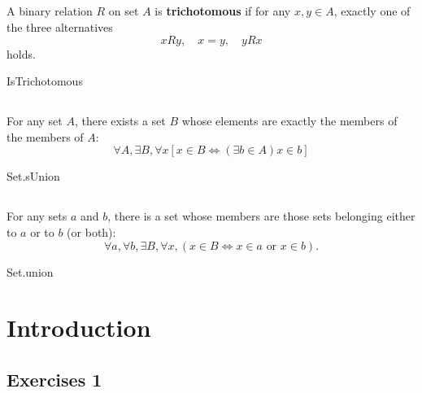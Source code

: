 \documentclass{report}
\begin{document}
\section{}%

  A binary relation $R$ on set $A$ is \textbf{trichotomous} if for any
    $x, y \in A$, exactly one of the three alternatives
    $$xRy, \quad x = y, \quad yRx$$
    holds.

    {IsTrichotomous}

\section{}%

  For any set $A$, there exists a set $B$ whose elements are exactly the members
    of the members of $A$:
    $$\forall A, \exists B, \forall x
      \left[ x \in B \iff (\exists b \in A) x \in b \right]$$

    {Set.sUnion}

\section{}%

  For any sets $a$ and $b$, there is a set whose members are those sets
    belonging either to $a$ or to $b$ (or both):
    $$\forall a, \forall b, \exists B, \forall x,
        (x \in B \iff x \in a \text{ or } x \in b).$$

    {Set.union}

\endgroup

\chapter{Introduction}%

\section{Exercises 1}%

\subsection{}%
\end{document}
